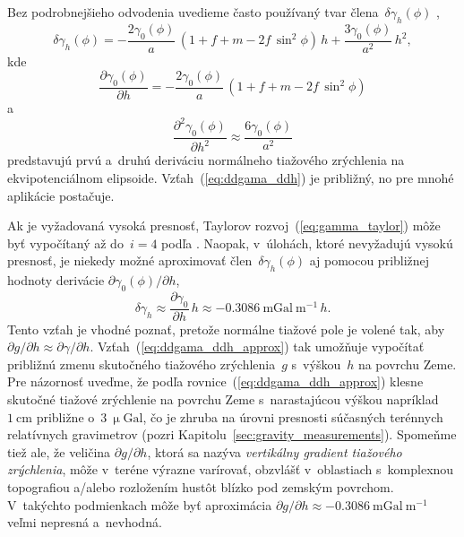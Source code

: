 \documentclass[a4paper, 12pt]{book}
\begin{document}
Bez podrobnejšieho odvodenia uvedieme často používaný tvar 
člena~$\delta\gamma_h(\phi)$ \parencite[pozri 
napríklad][]{MoritzPhysicalGeodesy},
%
\begin{equation}
\delta\gamma_h(\phi) = -\frac{2\gamma_0(\phi)}{a} \, (1 + f + m - 2f \, 
\sin^2\phi) \, h + \frac{3\gamma_0(\phi)}{a^2} \, h^2{,}
\end{equation}
%
kde
%
\begin{equation}
\frac{\partial \gamma_0(\phi)}{\partial h} = -\frac{2\gamma_0(\phi)}{a} \, (1 
+ f + m - 2f \, \sin^2\phi)
\end{equation}
%
a
%
\begin{equation}
\label{eq:ddgama_ddh}
\frac{\partial^2 \gamma_0(\phi)}{\partial h^2} \approx 
\frac{6\gamma_0(\phi)}{a^2}
\end{equation}
%
predstavujú prvú a~druhú deriváciu normálneho tiažového zrýchlenia na 
ekvipotenciálnom elipsoide.  Vzťah~(\ref{eq:ddgama_ddh}) je približný, no pre 
mnohé aplikácie postačuje.

Ak je vyžadovaná vysoká presnosť, Taylorov rozvoj~(\ref{eq:gamma_taylor}) môže 
byť vypočítaný až do~$i = 4$ podľa \textcite{Pick2000}.  Naopak, v~úlohách, 
ktoré nevyžadujú vysokú presnosť, je niekedy možné aproximovať 
člen~$\delta\gamma_h(\phi)$ aj pomocou približnej hodnoty derivácie $\partial 
\gamma_0(\phi) \slash \partial h$,
%
\begin{equation}
\label{eq:ddgama_ddh_approx}
\delta\gamma_h \approx \frac{\partial \gamma_0}{\partial h} \, h \approx 
-0.3086 \ \mathrm{mGal} \ \mathrm{m}^{-1} \, h{.}
\end{equation}
%
Tento vzťah je vhodné poznať, pretože normálne tiažové pole je volené tak, aby 
$\partial g \slash \partial h \approx \partial \gamma \slash \partial h$.  
Vzťah~(\ref{eq:ddgama_ddh_approx}) tak umožňuje vypočítať približnú zmenu 
skutočného tiažového zrýchlenia~$g$ s~výškou~$h$ na povrchu Zeme.  Pre 
názornosť uveďme, že podľa rovnice~(\ref{eq:ddgama_ddh_approx}) klesne skutočné 
tiažové zrýchlenie na povrchu Zeme s~narastajúcou výškou napríklad~$1 
\ \mathrm{cm}$ približne o~$3 \ \upmu\mathrm{Gal}$, čo je zhruba na úrovni 
presnosti súčasných terénnych relatívnych gravimetrov (pozri 
Kapitolu~\ref{sec:gravity_measurements}).  Spomeňme tiež ale, že veličina 
$\partial g \slash \partial h$, ktorá sa nazýva \emph{vertikálny gradient 
tiažového zrýchlenia}, môže v~teréne výrazne varírovať, obzvlášť v~oblastiach 
s~komplexnou topografiou a/alebo rozložením hustôt blízko pod zemským povrchom.  
V~takýchto podmienkach môže byť aproximácia $\partial g \slash \partial 
h \approx -0.3086 \ \mathrm{mGal} \ \mathrm{m}^{-1}$ veľmi nepresná a~nevhodná.
\end{document}
